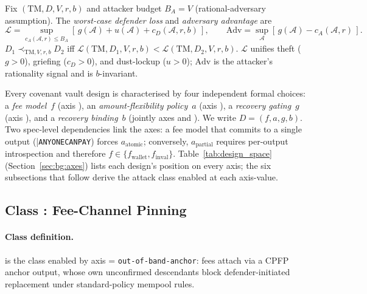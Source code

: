 \begin{definition}
\label{def:loss-adv}
Fix $(\mathrm{TM}, D, V, r, b)$ and attacker budget $B_A = V$
(rational-adversary assumption). The \emph{worst-case defender loss}
and \emph{adversary advantage} are
\[
  \mathcal{L} = \!\!\sup_{c_A(\mathcal{A}, r) \leq B_A}\!
    [\,g(\mathcal{A}) + u(\mathcal{A}) + c_D(\mathcal{A}, r, b)\,],
  \qquad
  \mathrm{Adv} = \sup_{\mathcal{A}} [\,g(\mathcal{A}) - c_A(\mathcal{A}, r)\,].
\]
$D_1 \prec_{\mathrm{TM}, V, r, b} D_2$ iff
$\mathcal{L}(\mathrm{TM}, D_1, V, r, b) < \mathcal{L}(\mathrm{TM}, D_2, V, r, b)$.
$\mathcal{L}$ unifies theft ($g>0$), griefing ($c_D > 0$), and
dust-lockup ($u > 0$); $\mathrm{Adv}$ is the attacker's rationality
signal and is $b$-invariant.
\end{definition}

Every covenant vault design is characterised by four independent
formal choices: a \emph{fee model}~$f$ (axis \axfee{}), an
\emph{amount-flexibility policy}~$a$ (axis \axrevault{}), a
\emph{recovery gating}~$g$ (axis \axauth{}), and a \emph{recovery
binding}~$b$ (jointly axes \axwdbind{} and \axrecbind{}). We write
$D = (f, a, g, b)$. Two spec-level dependencies link the axes: a fee
model that commits to a single output
(|\texttt{ANYONECANPAY}) forces $a_{\text{atomic}}$;
conversely, $a_{\text{partial}}$ requires per-output introspection and
therefore $f \in \{f_{\text{wallet}}, f_{\text{inval}}\}$.
Table~\ref{tab:design_space} (Section~\ref{sec:bg:axes}) lists each
design's position on every axis; the six subsections that follow
derive the attack class enabled at each axis-value.

\subsection{Class \classfee{}: Fee-Channel Pinning}
\label{sec:imposs:class_fee}

\paragraph{Class definition.} \classfee{} is the class enabled by
axis \axfee{} = \texttt{out-of-band-anchor}: fees attach via a CPFP
anchor output, whose own unconfirmed descendants block
defender-initiated replacement under standard-policy mempool rules.

